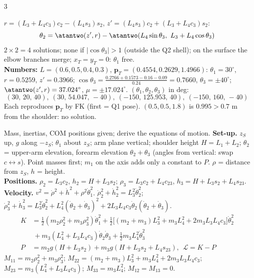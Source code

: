 \begin{multicols}{3}
\begin{examq}
$r=(L_3{+}L_4c_3)c_2-(L_4s_3)s_2$, $z'=(L_4s_3)c_2+(L_3{+}L_4c_3)s_2$:
\[\theta_2=\atantwo(z',r)-\atantwo(L_4\sin\theta_3,\ L_3+L_4\cos\theta_3)\]
$2\times2=4$ solutions; none if $|\cos\theta_3|>1$ (outside the Q2 shell); on the surface the elbow branches merge; $x_T=y_T=0$: $\theta_1$ free.\\
\textbf{Numbers:} $L=(0.6,0.5,0.4,0.3)$, $\mathbf p_T=(0.4554,0.2629,1.4966)$: $\theta_1=30^\circ$, $r=0.5259$, $z'=0.3966$; $\cos\theta_3=\frac{0.2766+0.1573-0.16-0.09}{0.24}=0.7660$, $\theta_3=\pm40^\circ$; $\atantwo(z',r)=37.024^\circ$, $\mu=\pm17.024^\circ$. $(\theta_1,\theta_2,\theta_3)$ in deg:
\[(30,\,20,\,40),\ (30,\,54.047,\,-40),\ (-150,\,125.953,\,40),\ (-150,\,160,\,-40)\]
Each reproduces $\mathbf p_T$ by FK (first = Q1 pose). $(0.5,0.5,1.8)$ is $0.995>0.7$ m from the shoulder: no solution. \chk
\end{examq}
\begin{examq}
Mass, inertias, COM positions given; derive the equations of motion.
\solution
\textbf{Set-up.} $z_S$ up, $g$ along $-z_S$; $\theta_1$ about $z_S$; arm plane vertical; shoulder height $H=L_1{+}L_2$; $\theta_2$ = upper-arm elevation, forearm elevation $\theta_2{+}\theta_3$ (angles from vertical: swap $c\leftrightarrow s$). Point masses first; $m_1$ on the axis adds only a constant to $P$. $\rho$ = distance from $z_S$, $h$ = height.\\
\textbf{Positions.} $\rho_2=L_3c_2$, $h_2=H+L_3s_2$; $\rho_3=L_3c_2+L_4c_{23}$, $h_3=H+L_3s_2+L_4s_{23}$.\\
\textbf{Velocity.} $v^2=\dot\rho^2+\dot h^2+\rho^2\dot\theta_1^2$. $\dot\rho_2^2+\dot h_2^2=L_3^2\dot\theta_2^2$; $\dot\rho_3^2+\dot h_3^2=L_3^2\dot\theta_2^2+L_4^2(\dot\theta_2{+}\dot\theta_3)^2+2L_3L_4c_3\dot\theta_2(\dot\theta_2{+}\dot\theta_3)$.
\begin{align*}K&=\tfrac12(m_2\rho_2^2+m_3\rho_3^2)\dot\theta_1^2+\tfrac12\big[(m_2{+}m_3)L_3^2+m_3L_4^2+2m_3L_3L_4c_3\big]\dot\theta_2^2\\&\ +m_3(L_4^2+L_3L_4c_3)\dot\theta_2\dot\theta_3+\tfrac12m_3L_4^2\dot\theta_3^2\\
P&=m_2g(H{+}L_3s_2)+m_3g(H{+}L_3s_2{+}L_4s_{23}),\ \ \mathcal L=K-P\end{align*}
$M_{11}=m_2\rho_2^2+m_3\rho_3^2$; $M_{22}=(m_2{+}m_3)L_3^2+m_3L_4^2+2m_3L_3L_4c_3$; $M_{23}=m_3(L_4^2+L_3L_4c_3)$; $M_{33}=m_3L_4^2$; $M_{12}=M_{13}=0$.

\end{examq}
\end{multicols}
